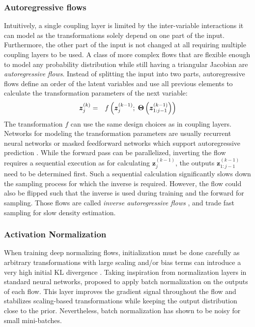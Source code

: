 \subsubsection{Autoregressive flows}
Intuitively, a single coupling layer is limited by the inter-variable interactions it can model as the transformations solely depend on one part of the input. 
Furthermore, the other part of the input is not changed at all requiring multiple coupling layers to be used.
A class of more complex flows that are flexible enough to model any probability distribution while still having a triangular Jacobian are \textit{autoregressive flows}. 
Instead of splitting the input into two parts, autoregressive flows define an order of the latent variables and use all previous elements to calculate the transformation parameters of the next variable:
\begin{eqnarray}
	\bm{z}^{(k)}_{j} & = & f\left(\bm{z}^{(k-1)}_{j};\hspace{1mm} \bm{\Theta}\left(\bm{z}^{(k-1)}_{1:j-1}\right)\right)
\end{eqnarray}
The transformation $f$ can use the same design choices as in coupling layers. 
Networks for modeling the transformation parameters are usually recurrent neural networks or masked feedforward networks which support autoregressive prediction \cite{MaskedAutoregressiveFlow}.
While the forward pass can be parallelized, inverting the flow requires a sequential execution as for calculating $\bm{z}^{(k-1)}_j$, the outputs $\bm{z}^{(k-1)}_{1:j-1}$ need to be determined first. 
Such a sequential calculation significantly slows down the sampling process for which the inverse is required. 
However, the flow could also be flipped such that the inverse is used during training and the forward for sampling. 
Those flows are called \textit{inverse autoregressive flows} \cite{InverseAutoregressiveFlows}, and trade fast sampling for slow density estimation.

\subsubsection{Activation Normalization}

When training deep normalizing flows, initialization must be done carefully as arbitrary transformations with large scaling and/or bias terms can introduce a very high initial KL divergence \cite{NormalizingFlowsOverview}. 
Taking inspiration from normalization layers in standard neural networks, \citet{RealNVP} proposed to apply batch normalization on the outputs of each flow. 
This layer improves the gradient signal throughout the flow and stabilizes scaling-based transformations while keeping the output distribution close to the prior. 
Nevertheless, batch normalization has shown to be noisy for small mini-batches.

